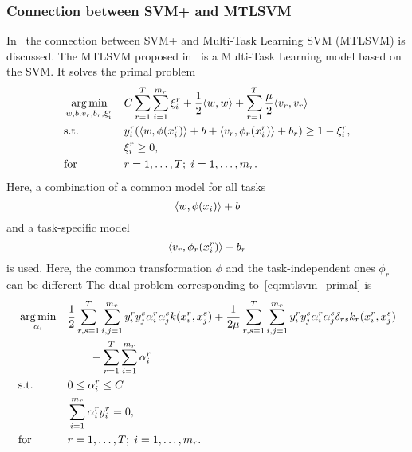 \subsubsection*{Connection between SVM+ and MTLSVM}
In~\cite{LiangC08} the connection between SVM+ and Multi-Task Learning SVM (MTLSVM) is discussed. 
The MTLSVM proposed in~\cite{LiangC08} is a Multi-Task Learning model based on the SVM. It solves the primal problem
\begin{equation}
    \label{eq:mtlsvm_primal}
    \begin{aligned}
        & \argmin_{w, b, v_r, b_r, \xi_i^r}
        & & C \sum_{r=1}^\ntasks \sum_{i=1}^{\npertask_r} \xi_i^r + \frac{1}{2} \dotp{w}{w} + \sum_{r=1}^\ntasks \frac{\mu}{2} \dotp{v_r}{v_r} \\
        & \text{s.t.}
        & & y_{i}^r ( \dotp{w}{\phi(x_{i}^r)} + b + \dotp{v_r}{\phi_r(x_{i}^r)} + b_r) \geq 1 - \xi_i^r ,\\
        & & &\xi_i^r \geq 0, \\
        & \text{for } & & r=1, \ldots, \ntasks; \; i=1, \ldots, \npertask_r.
    \end{aligned}
\end{equation}
Here, a combination of a common model for all tasks
$$ \langle w, \phi(x_{i}) \rangle + b $$
and a task-specific model
$$ \langle v_r, \phi_r(x_{i}^r) \rangle + b_r $$
is used. Here, the common transformation $\phi$ and the task-independent ones $\phi_r$ can be different 
The dual problem corresponding to~\eqref{eq:mtlsvm_primal} is
\begin{equation}\label{eq:mtlsvm_dual}
    \begin{aligned}
        & \argmin_{\alpha_i} 
        & & \frac{1}{2} \sum_{r, s=1}^\ntasks \sum_{i, j=1}^{\npertask_r} y_i^r y_j^s \alpha_i^r \alpha_j^s k(x_i^r, x_j^s) + \frac{1}{2 \mu} \sum_{r, s=1}^\ntasks  \sum_{i, j=1}^{\npertask_r} y_i^r y_j^s \alpha_i^r \alpha_j^s \delta_{rs} k_r(x^r_i, x^s_j) \\
        & & & \qquad - \sum_{r=1}^\ntasks \sum_{i=1}^{\npertask_r} \alpha_i^r \\
        & \text{s.t.}
        & & 0 \leq \alpha_i^r \leq C \\
        & & & \sum_{i=1}^{\npertask_r}{\alpha_i^r y_i^r} = 0, \\
        & \text{for } & & r=1, \ldots, \ntasks; \; i=1, \ldots, \npertask_r.
        \end{aligned}
\end{equation}
